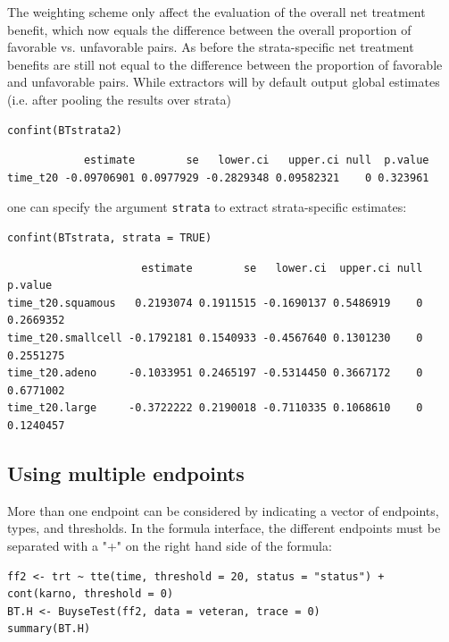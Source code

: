 \documentclass[12pt]{article}
\begin{document}
The weighting scheme only affect the evaluation of the overall net
treatment benefit, which now equals the difference between the overall
proportion of favorable vs. unfavorable pairs. As before the
strata-specific net treatment benefits are still not equal to the difference
between the proportion of favorable and unfavorable pairs. While
extractors will by default output global estimates (i.e. after pooling
the results over strata)
\lstset{language=r,label= ,caption= ,captionpos=b,numbers=none}
\begin{lstlisting}
confint(BTstrata2)
\end{lstlisting}

\begin{verbatim}
            estimate        se   lower.ci   upper.ci null  p.value
time_t20 -0.09706901 0.0977929 -0.2829348 0.09582321    0 0.323961
\end{verbatim}


one can specify the argument \texttt{strata} to extract strata-specific estimates:
\lstset{language=r,label= ,caption= ,captionpos=b,numbers=none}
\begin{lstlisting}
confint(BTstrata, strata = TRUE)
\end{lstlisting}

\begin{verbatim}
                     estimate        se   lower.ci  upper.ci null   p.value
time_t20.squamous   0.2193074 0.1911515 -0.1690137 0.5486919    0 0.2669352
time_t20.smallcell -0.1792181 0.1540933 -0.4567640 0.1301230    0 0.2551275
time_t20.adeno     -0.1033951 0.2465197 -0.5314450 0.3667172    0 0.6771002
time_t20.large     -0.3722222 0.2190018 -0.7110335 0.1068610    0 0.1240457
\end{verbatim}


\clearpage

\subsection{Using multiple endpoints}
\label{sec:org0800d97}
More than one endpoint can be considered by indicating a vector of
endpoints, types, and thresholds. In the formula interface, the
different endpoints must be separated with a "+" on the right hand
side of the formula:
\lstset{language=r,label= ,caption= ,captionpos=b,numbers=none}
\begin{lstlisting}
ff2 <- trt ~ tte(time, threshold = 20, status = "status") + cont(karno, threshold = 0)
BT.H <- BuyseTest(ff2, data = veteran, trace = 0)
summary(BT.H)
\end{lstlisting}
\end{document}
